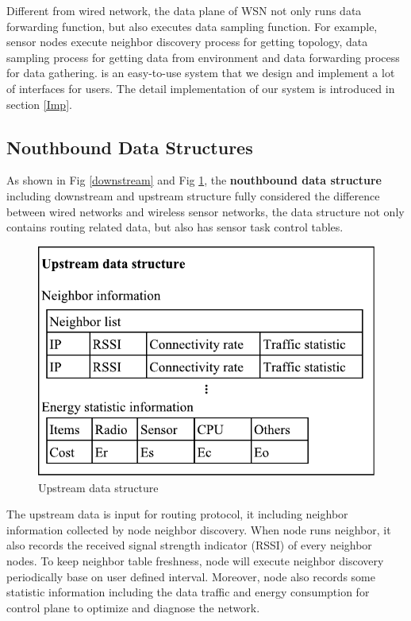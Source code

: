 Different from wired network, the data plane of WSN not only runs
data forwarding function, but also executes data sampling function. 
For example,  sensor nodes execute neighbor discovery process for getting topology, 
data sampling process for getting data from environment and data forwarding process
for data gathering. {\sdn} is an easy-to-use system that we design and implement a lot of 
interfaces for users. The detail implementation of our system is introduced in section \ref{Imp}.
\subsection{Nouthbound Data Structures}

As shown in Fig \ref{downstream} and Fig \ref{upstream}, the \textbf{nouthbound data structure} including downstream and upstream structure fully considered the difference between wired networks and wireless sensor networks, the data structure not only contains routing  related data, but also has sensor task control tables.

\begin{figure}[htbp]
	\centering
	\includegraphics[width=1\columnwidth]{Figure/upstream}
	\caption{Upstream data structure}
	\label{upstream}
\end{figure}

The upstream data is input for routing protocol, it including neighbor information collected by node neighbor discovery. 
When node runs neighbor, it also records the received signal strength indicator (RSSI) of every neighbor nodes. To keep neighbor table freshness, 
node will execute neighbor discovery periodically base on user defined interval.
Moreover, node also records some statistic information including the data traffic and energy consumption for control plane to optimize and diagnose the network.

